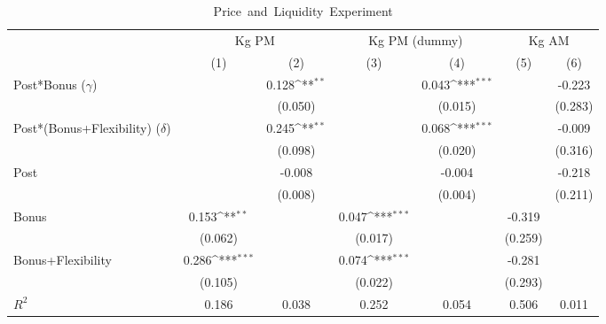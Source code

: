 {
\def\sym#1{\ifmmode^{#1}\else\(^{#1}\)\fi}
\begin{longtable}{l*{6}{c}}
\caption{\mbox{Price and Liquidity Experiment} \label{tab-bonus}}\\
\hline\hline\endfirsthead\hline\endhead\hline\endfoot\endlastfoot
                &\multicolumn{2}{c}{Kg PM}            &\multicolumn{2}{c}{Kg PM (dummy)}    &\multicolumn{2}{c}{Kg AM}            \\\cmidrule(lr){2-3}\cmidrule(lr){4-5}\cmidrule(lr){6-7}
                &\multicolumn{1}{c}{(1)}         &\multicolumn{1}{c}{(2)}         &\multicolumn{1}{c}{(3)}         &\multicolumn{1}{c}{(4)}         &\multicolumn{1}{c}{(5)}         &\multicolumn{1}{c}{(6)}         \\
\hline
Post*Bonus ($\gamma$)&                  &    0.128\sym{**} &                  &    0.043\sym{***}&                  &   -0.223         \\
                &                  &  (0.050)         &                  &  (0.015)         &                  &  (0.283)         \\
Post*(Bonus+Flexibility) ($\delta$)&                  &    0.245\sym{**} &                  &    0.068\sym{***}&                  &   -0.009         \\
                &                  &  (0.098)         &                  &  (0.020)         &                  &  (0.316)         \\
Post            &                  &   -0.008         &                  &   -0.004         &                  &   -0.218         \\
                &                  &  (0.008)         &                  &  (0.004)         &                  &  (0.211)         \\
Bonus           &    0.153\sym{**} &                  &    0.047\sym{***}&                  &   -0.319         &                  \\
                &  (0.062)         &                  &  (0.017)         &                  &  (0.259)         &                  \\
Bonus+Flexibility&    0.286\sym{***}&                  &    0.074\sym{***}&                  &   -0.281         &                  \\
                &  (0.105)         &                  &  (0.022)         &                  &  (0.293)         &                  \\
\hline
\(R^{2}\)       &    0.186         &    0.038         &    0.252         &    0.054         &    0.506         &    0.011         \\

\end{longtable}}
